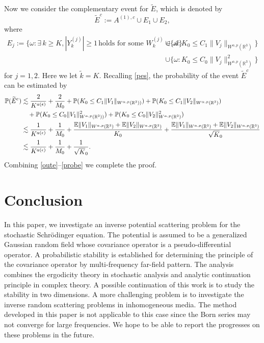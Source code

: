 \documentclass[reqno, 12pt]{amsart}
\numberwithin{equation}{section}
\begin{document}
  Now we consider the complementary event for $\widetilde E$,
	which is denoted by 
	\[
	\widetilde{E}^c:=A^{(1),c}\cup E_1 \cup E_2,\] where
    \begin{align*} E_j:=\{\omega:\exists \,k \ge K, |Y_k^{(j)}| \ge 1 \,\text{holds for some } W_k^{(j)} \in \mathcal A\} &\cup\{\omega: K_0 \le C_1\|V_j\|_{W^{\alpha,p}(\mathbb R^3)} \} \\ &\cup\{\omega: K_0 \le C_0 \|V_j\|^2_{W^{\alpha,p}(\mathbb R^3)}\}
	\end{align*} for $j=1,2.$
	Here we let $\tilde k=K$.
	Recalling \eqref{pes}, the probability of the event $\widetilde{E}^c$ can be estimated by \begin{align}
	    \mathbb P(\widetilde{E}^c) &\lesssim \frac{2}{K^{a(\epsilon)}}+\frac{2}{M_0}+\mathbb P(K_0 \le C_1\|V_1\|_{W^{\alpha,p}(\mathbb R^3))})+\mathbb P(K_0  \le C_1\|V_2\|_{W^{\alpha,p}(\mathbb R^3)}) \\ &\quad+\mathbb P(K_0 \le C_0\|V_1\|^2_{W^{\alpha,p}(\mathbb R^3))})+\mathbb P(K_0  \le C_0\|V_2\|^2_{W^{\alpha,p}(\mathbb R^3)})\notag\\ & \lesssim\frac{1}{K^{a(\epsilon)}}+\frac{1}{M_0}+\frac{\mathbb E\|V_1\|_{W^{\alpha,p}(\mathbb R^3)}+\mathbb E\|V_2\|_{W^{\alpha,p}(\mathbb R^3)}}{K_0} +\frac{\mathbb E\|V_1\|_{W^{\alpha,p}(\mathbb R^3)}+\mathbb E\|V_2\|_{W^{\alpha,p}(\mathbb R^3)}}{\sqrt K_0}\notag\\ &\lesssim\frac{1}{K^{a(\epsilon)}}+ \frac{1}{M_0}+\frac{1}{\sqrt K_0}. \label{probe}
	\end{align} 
Combining \eqref{oute}--\eqref{probe} we complete the proof.

\section{Conclusion}

In this paper, we investigate an inverse potential scattering problem for the stochastic Schr\"odinger equation. The potential is assumed to be 
a generalized Gaussian random field whose covariance operator is a pseudo-differential operator. A  probabilistic stability is established 
for determining the principle of the covariance operator by multi-frequency far-field pattern. The analysis combines the ergodicity theory in stochastic analysis
and analytic continuation principle in complex theory. 
A possible continuation of this work is to study the stability in two dimensions. A more challenging problem is to investigate the inverse random scattering problems in inhomogeneous media. The method developed in this paper is not applicable to this case since
the Born series may not converge for large frequencies. We hope to be able to report the progresses on these problems in the future.
\end{document}
